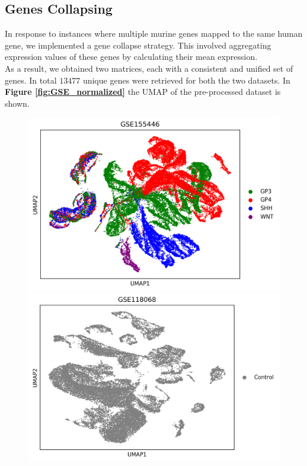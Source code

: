 \documentclass[10pt]{SelfArx} %
\begin{document}
\subsection{Genes Collapsing}\label{sec:genes_collapsing_results}
In response to instances where multiple murine genes mapped to the same human gene, we implemented a gene collapse strategy. This involved aggregating expression values of these genes by calculating their mean expression. \\
As a result, we obtained two matrices, each with a consistent and unified set of genes. In total $13477$ unique genes were retrieved for both the two datasets. In \textbf{Figure \ref{fig:GSE_normalized}} the UMAP of the pre-processed dataset is shown.

\begin{figure}[H]
    \begin{minipage}{0.48\textwidth}
        \centering
        \includegraphics[width=\textwidth]{project-report/figures/umap/GSE155446_umap_plot_def.png}
    \end{minipage}\hfill
    \begin{minipage}{0.48\textwidth}
        \centering
        \includegraphics[width=\textwidth]{project-report/figures/umap/GSE118068_umap_plot_def.png}

\end{minipage}
\end{figure}
\end{document}
